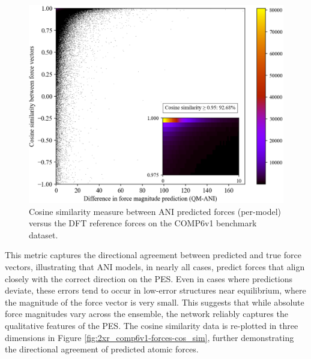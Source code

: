 \begin{figure}[H]
    \centering
    \includegraphics[width=1\linewidth]{Images/2xr_forces/cos_sim-hist2d-insert.png}
    \caption[2D histogram of cosine similarity measure of predicted atomic force vectors]{
    Cosine similarity measure between ANI predicted forces (per-model) versus the DFT reference forces on the COMP6v1 benchmark dataset.
    }
    \label{fig:2d_2xr_comp6v1-forces-cos_sim}
\end{figure}

This metric captures the directional agreement between predicted and true force vectors, illustrating that ANI models, in nearly all cases, predict forces that align closely with the correct direction on the PES. 
Even in cases where predictions deviate, these errors tend to occur in low-error structures near equilibrium, where the magnitude of the force vector is very small. 
This suggests that while absolute force magnitudes vary across the ensemble, the network reliably captures the qualitative features of the PES.
The cosine similarity data is re-plotted in three dimensions in Figure \ref{fig:2xr_comp6v1-forces-cos_sim}, further demonstrating the directional agreement of predicted atomic forces.

